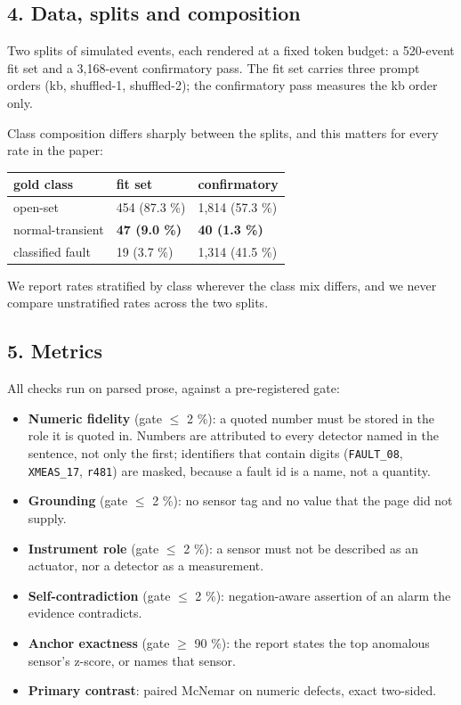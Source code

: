 \documentclass[
  10pt,
]{article}
\providecommand{\tightlist}{%
  \setlength{\itemsep}{0pt}\setlength{\parskip}{0pt}}
\begin{document}
\subsection{4. Data, splits and
composition}\label{data-splits-and-composition}

Two splits of simulated events, each rendered at a fixed token budget: a
520-event fit set and a 3,168-event confirmatory pass. The fit set
carries three prompt orders (kb, shuffled-1, shuffled-2); the
confirmatory pass measures the kb order only.

Class composition differs sharply between the splits, and this matters
for every rate in the paper:

\begin{longtable}[]{@{}lll@{}}
\toprule\noalign{}
gold class & fit set & confirmatory \\
\midrule\noalign{}
\endhead
\bottomrule\noalign{}
\endlastfoot
open-set & 454 (87.3 \%) & 1,814 (57.3 \%) \\
normal-transient & \textbf{47 (9.0 \%)} & \textbf{40 (1.3 \%)} \\
classified fault & 19 (3.7 \%) & 1,314 (41.5 \%) \\
\end{longtable}

We report rates stratified by class wherever the class mix differs, and
we never compare unstratified rates across the two splits.

\subsection{5. Metrics}\label{metrics}

All checks run on parsed prose, against a pre-registered gate:

\begin{itemize}
\tightlist
\item
  \textbf{Numeric fidelity} (gate $\leq$ 2 \%): a quoted number must be
  stored in the role it is quoted in. Numbers are attributed to every
  detector named in the sentence, not only the first; identifiers that
  contain digits (\texttt{FAULT\_08}, \texttt{XMEAS\_17}, \texttt{r481})
  are masked, because a fault id is a name, not a quantity.
\item
  \textbf{Grounding} (gate $\leq$ 2 \%): no sensor tag and no value that the
  page did not supply.
\item
  \textbf{Instrument role} (gate $\leq$ 2 \%): a sensor must not be described
  as an actuator, nor a detector as a measurement.
\item
  \textbf{Self-contradiction} (gate $\leq$ 2 \%): negation-aware assertion of
  an alarm the evidence contradicts.
\item
  \textbf{Anchor exactness} (gate $\geq$ 90 \%): the report states the top
  anomalous sensor's z-score, or names that sensor.
\item
  \textbf{Primary contrast}: paired McNemar on numeric defects, exact
  two-sided.
\end{itemize}
\end{document}
